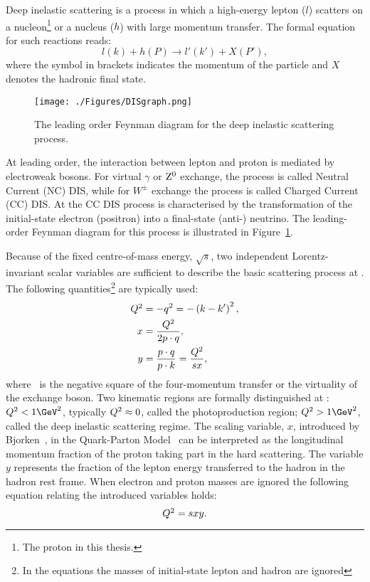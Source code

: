 Deep inelastic scattering is a process in which a high-energy lepton ($l$) scatters on a nucleon\footnote{The proton in this thesis.} or a nucleus ($h$) with large momentum transfer. The formal equation for such reactions reads:
\[
l\left( k \right) + h\left( P \right) \rightarrow l'\left( k' \right) + X\left( P' \right),
\]
where the symbol in brackets indicates the momentum of the particle and $X$ denotes the hadronic final state.
\begin{figure}
	\centering
		\texttt{[image: ./Figures/DISgraph.png]}
	\caption{The leading order Feynman diagram for the deep inelastic scattering process.}
	\label{fig:DISgraph}
\end{figure}
At leading order, the interaction between lepton and proton is mediated by electroweak bosons. For virtual $\gamma$ or $\mbox{$\rm{Z}^0$}$ exchange, the process is called Neutral Current (NC) DIS, while for $W^\pm$ exchange the process is called Charged Current (CC) DIS. At \hera the CC DIS process is characterised by the transformation of the initial-state electron (positron) into a final-state (anti-) neutrino. The leading-order Feynman diagram for this process is illustrated in Figure~\ref{fig:DISgraph}.

Because of the fixed centre-of-mass energy, $\sqrt{s}$, two independent Lorentz-invariant scalar variables are sufficient to describe the basic scattering process at \hera. The following quantities\footnote{In the equations the masses of initial-state lepton and hadron are ignored} are typically used:
\begin{align}
\mbox{${Q^2}$} &= -q^2 = -\left( k - k' \right)^2,\\
     x &= \frac{\mbox{${Q^2}$}}{2p\cdot q},\\
		 y &= \frac{p\cdot q}{p\cdot k} = \frac{\mbox{${Q^2}$}}{sx},
\label{eq:vardefinit}
\end{align}
where \qsq\, is the negative square of the four-momentum transfer or the virtuality of the exchange boson. Two kinematic regions are formally distinguished at \hera: $\qsq < 1\GeV^2$, typically $\mbox{${Q^2}$} \approx 0$, called the photoproduction region; $\qsq > 1 \GeV^2$, called the deep inelastic scattering regime. The scaling variable, $x$, introduced by Bjorken~\cite{Bjorken:1968dy}, in the Quark-Parton Model~\cite{Feynman:1969ej,Feynman:1973xc} can be interpreted as the longitudinal momentum fraction of the proton taking part in the hard scattering. The variable $y$ represents the fraction of the lepton energy transferred to the hadron in the hadron rest frame. When electron and proton masses are ignored the following equation relating the introduced variables holds:
\begin{equation}
\mbox{${Q^2}$} = sxy.
\label{eq:qsxy}
\end{equation}

